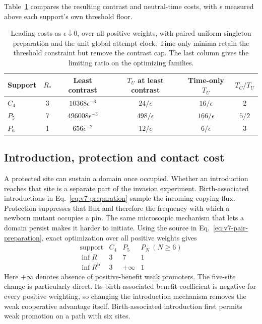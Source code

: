 \documentclass[aps,pre,reprint,amsmath,amssymb,longbibliography]{revtex4-2}
\begin{document}
Table~\ref{tab:cost} compares the resulting contrast and neutral-time
costs, with $\epsilon$ measured above each support's own threshold floor.
\begin{table}[t]
\caption{Leading costs as $\epsilon\downarrow0$, over all positive weights,
with paired uniform singleton preparation and the unit global attempt
clock. Time-only minima retain the threshold constraint but remove the
contrast cap. The last column gives the limiting ratio on the optimizing
families.}
\label{tab:cost}
\begin{ruledtabular}
\begin{tabular}{lccccc}
Support&$R_*$&Least contrast&$T_U$ at least contrast&Time-only $T_U$&$T_C/T_U$\\
\hline
$C_4$&3&$10368\epsilon^{-3}$&$24/\epsilon$&$16/\epsilon$&2\\
$P_5$&7&$496008\epsilon^{-3}$&$498/\epsilon$&$166/\epsilon$&$5/2$\\
$P_6$&1&$656\epsilon^{-2}$&$12/\epsilon$&$6/\epsilon$&3
\end{tabular}
\end{ruledtabular}
\end{table}



\subsection{Introduction, protection and contact cost}
\label{sec:v7-preparation-cost}
A protected site can sustain a domain once occupied. Whether an
introduction reaches that site is a separate part of the invasion
experiment. Birth-associated introductions in Eq.~\eqref{eq:v7-preparation}
sample the incoming copying flux. Protection suppresses that flux and
therefore the frequency with which a newborn mutant occupies a pin.
The same microscopic mechanism that lets a domain persist makes it
harder to initiate. Using the source in
Eq.~\eqref{eq:v7-pair-preparation}, exact optimization over all positive weights gives
\begin{equation}
 \begin{array}{c|ccc}
  \text{support}&C_4&P_5&P_N\ (N\ge6)\\ \hline
  \inf R&3&7&1\\
  \inf R^{\mathrm b}&3&+\infty&1
 \end{array}
 \label{eq:v7-preparation-classification}
\end{equation}
Here $+\infty$ denotes absence of positive-benefit weak promoters.
The five-site change is particularly direct. Its birth-associated
benefit coefficient is negative for every positive weighting, so
changing the introduction mechanism removes the weak cooperative
advantage itself. Birth-associated introduction first permits weak
promotion on a path with six sites.
\end{document}
